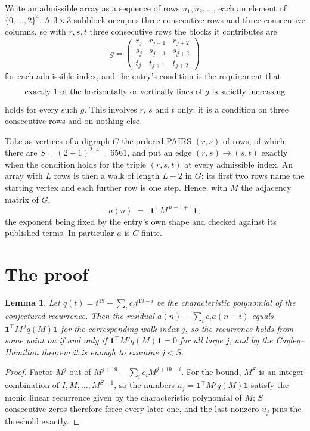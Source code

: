 \documentclass[11pt,a4paper]{article}
\theoremstyle{plain}
\newtheorem{lemma}[theorem]{Lemma}
\theoremstyle{definition}
\begin{document}
Write an admissible array as a sequence of rows $u_1,u_2,\dots$, each an element of
$\{0,\dots,2\}^{4}$. A $3\times3$ subblock occupies three consecutive rows and
three consecutive columns, so with $r,s,t$ three consecutive rows the blocks it
contributes are
\[
g=\begin{pmatrix}r_j&r_{j+1}&r_{j+2}\\ s_j&s_{j+1}&s_{j+2}\\ t_j&t_{j+1}&t_{j+2}\end{pmatrix}
\]
for each admissible index, and the entry's condition is the requirement that
\[
\text{exactly }1\text{ of the horizontally or vertically lines of }g\text{ \text{is strictly increasing}}
\]
holds for every such $g$. This involves $r$, $s$ and $t$ only: it is a condition on
three consecutive rows and on nothing else.

Take as vertices of a digraph $G$ the ordered PAIRS $(r,s)$ of rows, of which there are
$S=(2+1)^{2\cdot4}=6561$, and put an edge $(r,s)\to(s,t)$ exactly when the condition
holds for the triple $(r,s,t)$ at every admissible index. An array with $L$ rows is then a
walk of length $L-2$ in $G$: its first two rows name the starting vertex and each further
row is one step. Hence, with $M$ the adjacency matrix of $G$,
\[
a(n)\;=\;\,\mathbf{1}^{\!\top}M^{\,n-1+1}\mathbf{1},
\]
the exponent being fixed by the entry's own shape and checked against its published terms.
In particular $a$ is $C$-finite.

\section{The proof}

\begin{lemma}\label{lem:crit}
Let $q(t)=t^{19}-\sum_i c_it^{19-i}$ be the characteristic polynomial of the
conjectured recurrence. Then the residual $a(n)-\sum_ic_ia(n-i)$ equals
$\mathbf{1}^{\!\top}M^{\,j}q(M)\mathbf{1}$ for the corresponding walk index
$j$, so the recurrence holds from some point on if and only if
$\mathbf{1}^{\!\top}M^{j}q(M)\mathbf{1}=0$ for all large $j$; and by the
Cayley--Hamilton theorem it is enough to examine $j<S$.
\end{lemma}

\begin{proof}
Factor $M^{j}$ out of $M^{j+19}-\sum_ic_iM^{j+19-i}$. For the bound, $M^{S}$
is an integer combination of $I,M,\dots,M^{S-1}$, so the numbers
$u_j=\mathbf{1}^{\!\top}M^{j}q(M)\mathbf{1}$ satisfy the monic linear recurrence given by
the characteristic polynomial of $M$; $S$ consecutive zeros therefore force every later one,
and the last nonzero $u_j$ pins the threshold exactly.
\end{proof}
\end{document}
